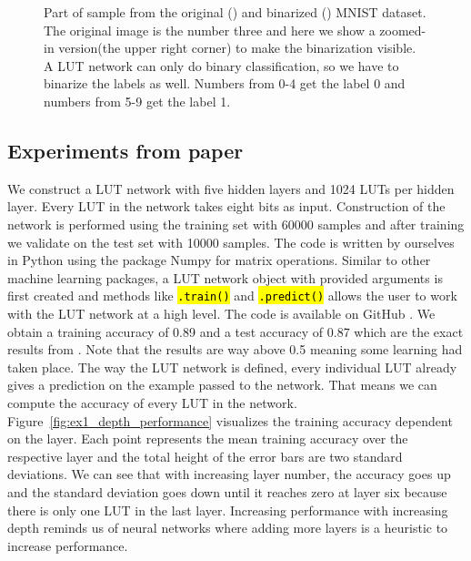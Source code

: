 \begin{figure}[!htb]
\begin{minipage}[b]{.48\linewidth}
      \label{fig:mnist_dataset_binarized}
  \end{minipage}
  \caption{Part of sample from the original () and binarized () MNIST dataset. The original image is the number three and here we show a zoomed-in version(the upper right corner) to make the binarization visible. A LUT network can only do binary classification, so we have to binarize the labels as well. Numbers from 0-4 get the label 0 and numbers from 5-9 get the label 1.}
\label{fig:mnist_dataset}
\end{figure}
\FloatBarrier

\subsection{Experiments from paper}
We construct a LUT network with five hidden layers and 1024 LUTs per hidden layer. Every LUT in the network takes eight bits as input. Construction of the network is performed using the training set with 60000 samples and after training we validate on the test set with 10000 samples. The code is written by ourselves in Python using the package Numpy \cite{bib:harris2020array} for matrix operations. Similar to other machine learning packages, a LUT network object with provided arguments is first created and methods like \hl{\texttt{.train()}} and \hl{\texttt{.predict()}} allows the user to work with the LUT network at a high level. The code is available on GitHub \cite{bib:lut_github}. We obtain a training accuracy of 0.89 and a test accuracy of 0.87 which are the exact results from \cite{bib:chatterjee2018learning}. Note that the results are way above 0.5 meaning some learning had taken place. The way the LUT network is defined, every individual LUT already gives a prediction on the example passed to the network. That means we can compute the accuracy of every LUT in the network. Figure~\ref{fig:ex1_depth_performance} visualizes the training accuracy dependent on the layer. Each point represents the mean training accuracy over the respective layer and the total height of the error bars are two standard deviations. We can see that with increasing layer number, the accuracy goes up and the standard deviation goes down until it reaches zero at layer six because there is only one LUT in the last layer. Increasing performance with increasing depth reminds us of neural networks where adding more layers is a heuristic to increase performance.

